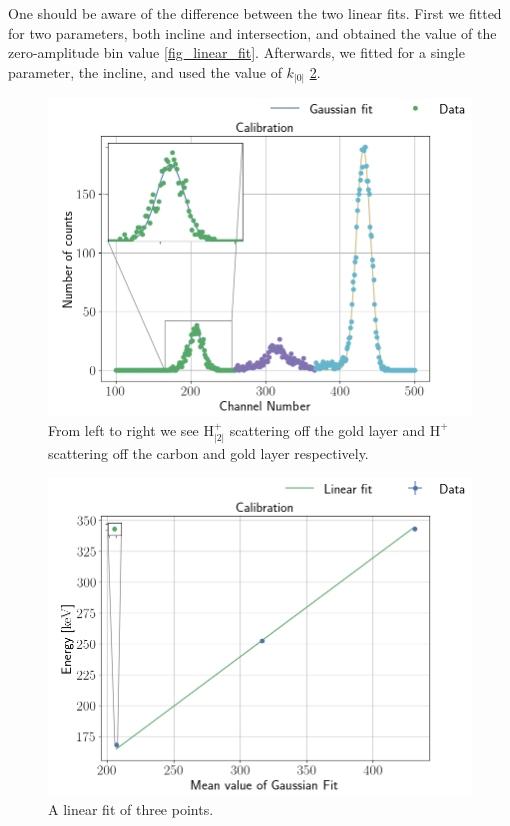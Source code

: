 One should be aware of the difference between the two linear fits. First we
fitted for two parameters, both incline and intersection, and obtained the
value of the zero-amplitude bin value \cref{fig_linear_fit}. Afterwards, we fitted for a single
parameter, the incline, and used the value of $k_|0|$ \cref{fig_linear_fit2}.

\begin{figure}[t]
\centering
\includegraphics[width=0.99\columnwidth]{gaussian_fit2}
\caption{From left to right we see $\mathrm{H_|2|^{+}}$ scattering off the gold layer
and $\mathrm{H^+}$ scattering off the carbon and gold layer respectively.}
\label{fig_gaussian_fit2}
\end{figure}

\begin{figure}[t]
\centering
\includegraphics[width=0.99\columnwidth]{alpha_plotting}
\caption{A linear fit of three points.}
\label{fig_linear_fit2}
\end{figure}

